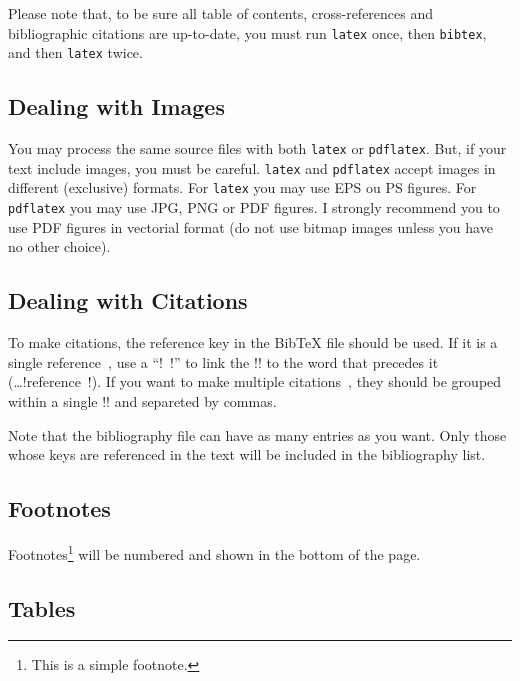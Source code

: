 Please note that, to be sure all table of contents, cross-references and bibliographic citations are up-to-date, you must run \verb!latex! once, then \verb!bibtex!, and then \verb!latex! twice.

\subsection{Dealing with Images} %
\label{sub:dealing_with_images}

You may process the same source files with both \verb!latex! or \verb!pdflatex!. But, if your text include images, you must be careful. \verb!latex! and \verb!pdflatex! accept images in different (exclusive) formats.  For \verb!latex! you may use EPS ou PS figures. For \verb!pdflatex! you may use JPG, PNG or PDF figures.  I strongly recommend you to use PDF figures in vectorial format (do not use bitmap images unless you have no other choice).


\subsection{Dealing with Citations} %

To make citations, the reference key in the BibTeX file should be used. If it is a single reference~\cite{Artho04}, use a ``\latexinline!~!'' to link the \latexinline!\cite{...}! to the word that precedes it (\ldots\latexinline!reference~\cite{Artho04}!). If you want to make multiple citations~\cite{Shavit95,Silberschatz06,Moss85}, they should be grouped within a single \latexinline!\cite{...}! and separeted by commas.

Note that the bibliography file can have as many entries as you want. Only those whose keys are referenced in the text will be included in the bibliography list.


\subsection{Footnotes} %

Footnotes\footnote{This is a simple footnote.} will be numbered and shown in the bottom of the page.


\subsection{Tables} %

